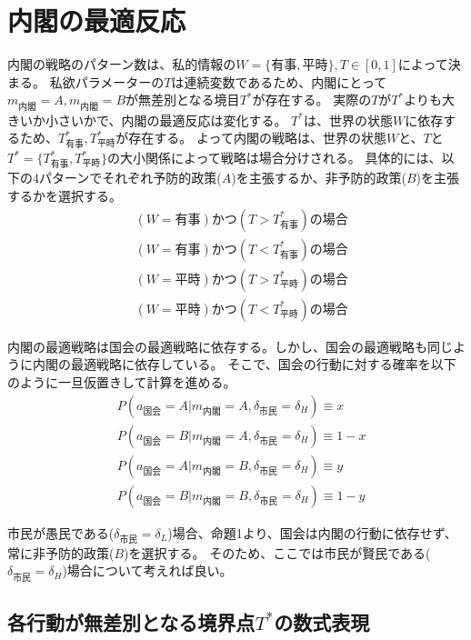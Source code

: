 \documentclass[main.tex]{subfiles}
\begin{document}
\section{内閣の最適反応}



内閣の戦略のパターン数は、私的情報の$W=\lbrace 有事, 平時\rbrace, T\in[0,1]$によって決まる。
私欲パラメーターの$T$は連続変数であるため、内閣にとって$m_{内閣}=A,m_{内閣}=B$が無差別となる境目$T^*$が存在する。
実際の$T$が$T^*$よりも大きいか小さいかで、内閣の最適反応は変化する。
$T^*$は、世界の状態$W$に依存するため、$T^*_{有事}, T^*_{平時}$が存在する。
よって内閣の戦略は、世界の状態$W$と、$T$と$T^* = \lbrace T^*_{有事}, T^*_{平時} \rbrace$の大小関係によって戦略は場合分けされる。
具体的には、以下の4パターンでそれぞれ予防的政策($A$)を主張するか、非予防的政策($B$)を主張するかを選択する。
\begin{align*}
    & (W=有事) かつ (T > T^*_{有事}) の場合 \\
    & (W=有事) かつ (T < T^*_{有事}) の場合 \\
    & (W=平時) かつ (T > T^*_{平時}) の場合 \\
    & (W=平時) かつ (T < T^*_{平時}) の場合 
\end{align*}


内閣の最適戦略は国会の最適戦略に依存する。しかし、国会の最適戦略も同じように内閣の最適戦略に依存している。
そこで、国会の行動に対する確率を以下のように一旦仮置きして計算を進める。
\begin{align*}
    & P(a_{国会} = A| m_{内閣} = A, \delta_{市民} = \delta_H ) \equiv x \\
    & P(a_{国会} = B| m_{内閣} = A, \delta_{市民} = \delta_H ) \equiv 1-x \\
    & P(a_{国会} = A| m_{内閣} = B, \delta_{市民} = \delta_H ) \equiv y \\
    & P(a_{国会} = B| m_{内閣} = B, \delta_{市民} = \delta_H ) \equiv 1-y
\end{align*}

市民が愚民である($\delta_{市民}=\delta_L$)場合、命題1より、国会は内閣の行動に依存せず、常に非予防的政策($B$)を選択する。
そのため、ここでは市民が賢民である($\delta_{市民}=\delta_H$)場合について考えれば良い。




\subsection{各行動が無差別となる境界点$T^*$の数式表現}
\end{document}
